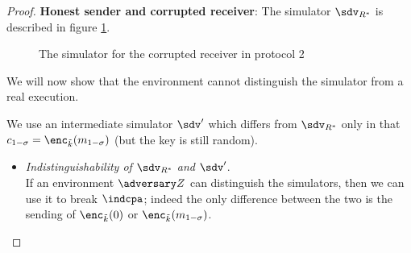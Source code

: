 \begin{proof}
    \textbf{Honest sender and corrupted receiver}: The simulator $\sdv_{R^\ast}$ is described in figure \ref{sim_dummy2_receiver}.

        \begin{figure}
        \begin{center}
        \end{center}
    \caption{The simulator for the corrupted receiver in protocol 2}
    \label{sim_dummy2_receiver}
    \end{figure}

    We will now show that the environment cannot distinguish the simulator from a real execution.

    We use an intermediate simulator $\sdv'$ which differs from $\sdv_{R^\ast}$ only in that $c_{1-\sigma}=\enc_{\tilde k}(m_{1-\sigma})$ (but the key is still random).

    \begin{itemize}
        \item \textit{Indistinguishability of $\sdv_{R^\ast}$ and $\sdv'$}.\\
        If an environment $\zdv$ can distinguish the simulators, then we can use it to break $\indcpa$; indeed the only difference between the two is the sending of $\enc_{\tilde k}(0)$ or $\enc_{\tilde k}(m_{1-\sigma})$.
        

\end{itemize}
\end{proof}
